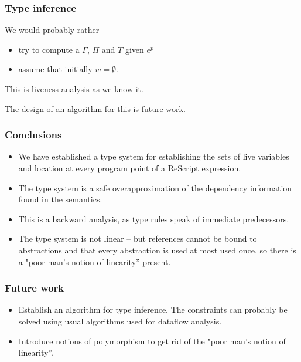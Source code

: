 \documentclass{beamer}
\begin{document}
\begin{frame}
  \frametitle{Type inference}

  We would probably rather

  \begin{itemize}
  \item try to compute a $\Gamma$, $\Pi$ and $T$
    given $e^p$   
  \item assume that initially $w = \emptyset$.
  \end{itemize}

  This is liveness analysis as we know it.

  The design of an algorithm for this is future work.
\end{frame}

\begin{frame}
  \frametitle{Conclusions}

  \begin{itemize}
 
  \item We have established a type system for establishing the sets of
    live variables and location at every program point of a ReScript
    expression.
  \item The type system is a safe overapproximation of the dependency
    information found in the semantics.
  \item This is a backward analysis, as type rules speak of immediate
    predecessors.
  \item The type system is not linear -- but references cannot be bound to
abstractions and that every abstraction is used at most used once, so
there is a "poor man's notion of linearity'' present.
  \end{itemize}
\end{frame}

\begin{frame}
  \frametitle{Future work}

  \begin{itemize}
  \item Establish an algorithm for type inference. The constraints can
    probably be solved using usual algorithms used for dataflow analysis.
  \item Introduce notions of polymorphism to get rid of the "poor man's notion of linearity''.
  \end{itemize}
\end{frame}
\end{document}
